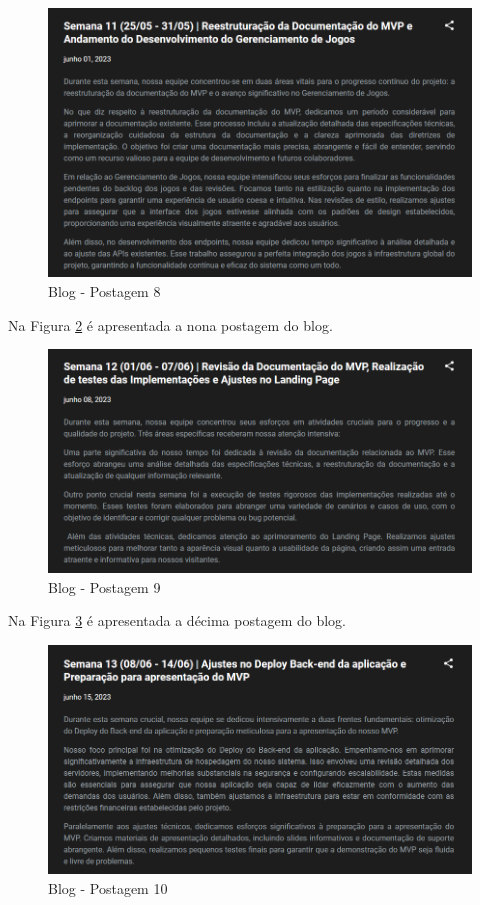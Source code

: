 \begin{apendicesenv}
\begin{figure}[H]
	\centering
	\includegraphics[scale=0.68]{./imagens/Blog8.png}
	\caption{Blog - Postagem 8}
    \label{fig:116}
\end{figure}
\pagebreak

Na Figura \ref{fig:117} é apresentada a nona postagem do blog.

\begin{figure}[H]
	\centering
	\includegraphics[scale=0.68]{./imagens/Blog9.png}
	\caption{Blog - Postagem 9}
    \label{fig:117}
\end{figure}

Na Figura \ref{fig:118} é apresentada a décima postagem do blog.

\begin{figure}[H]
	\centering
	\includegraphics[scale=0.68]{./imagens/Blog10.png}
	\caption{Blog - Postagem 10}
    \label{fig:118}
\end{figure}
\pagebreak


\end{apendicesenv}
